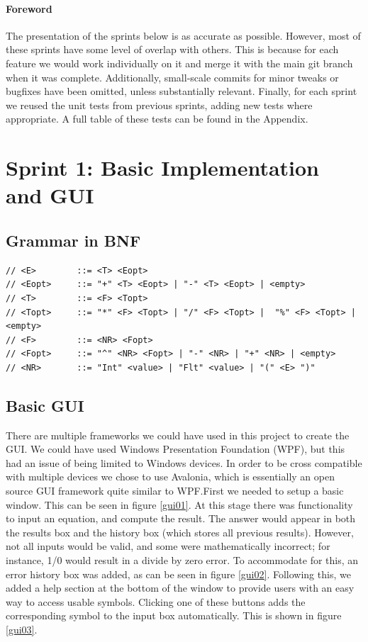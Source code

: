 \documentclass[a4paper, oneside, 11pt]{report}
\begin{document}

    \paragraph{Foreword} The presentation of the sprints below is as accurate as possible. However, most of these sprints have some level of overlap with others. This is because for each feature we would work individually on it and merge it with the main git branch when it was complete. Additionally, small-scale commits for minor tweaks or bugfixes have been omitted, unless substantially relevant. Finally, for each sprint we reused the unit tests from previous sprints, adding new tests where appropriate. A full table of these tests can be found in the Appendix.


    \section{Sprint 1: Basic Implementation and GUI}
    \subsection{Grammar in BNF}
    \begin{verbatim}
// <E>        ::= <T> <Eopt>
// <Eopt>     ::= "+" <T> <Eopt> | "-" <T> <Eopt> | <empty>
// <T>        ::= <F> <Topt>
// <Topt>     ::= "*" <F> <Topt> | "/" <F> <Topt> |  "%" <F> <Topt> |<empty>
// <F>        ::= <NR> <Fopt>
// <Fopt>     ::= "^" <NR> <Fopt> | "-" <NR> | "+" <NR> | <empty>
// <NR>       ::= "Int" <value> | "Flt" <value> | "(" <E> ")"
    \end{verbatim}

    \subsection{Basic GUI}
    There are multiple frameworks we could have used in this project to create the GUI. We could have used Windows Presentation Foundation (WPF), but this had an issue of being limited to Windows devices. In order to be cross compatible with multiple devices we chose to use Avalonia, which is essentially an open source GUI framework quite similar to WPF.\newline First we needed to setup a basic window. This can be seen in figure \ref{gui01}. At this stage there was functionality to input an equation, and compute the result. The answer would appear in both the results box and the history box (which stores all previous results). However, not all inputs would be valid, and some were mathematically incorrect; for instance, 1/0 would result in a divide by zero error. To accommodate for this, an error history box was added, as can be seen in figure \ref{gui02}. Following this, we added a help section at the bottom of the window to provide users with an easy way to access usable symbols. Clicking one of these buttons adds the corresponding symbol to the input box automatically. This is shown in figure \ref{gui03}.
\end{document}
